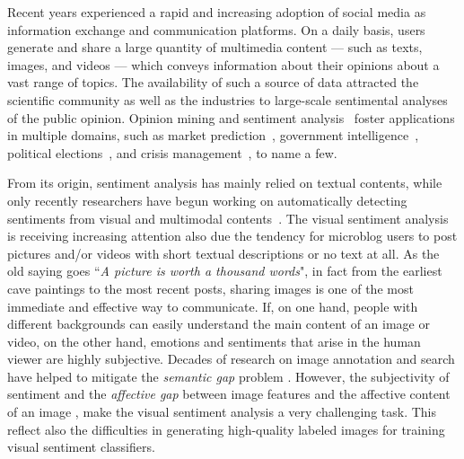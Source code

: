 Recent years experienced a rapid and increasing adoption of social media as information exchange and communication platforms.
On a daily basis, users generate and share a large quantity of multimedia content --- such as texts, images, and videos --- which conveys information about their opinions about a vast range of topics.
The availability of such a source of data attracted the scientific community as well as the industries to large-scale sentimental analyses of the public opinion.
Opinion mining and sentiment analysis~\cite{pang2008opinion} foster applications in multiple domains, such as market prediction~\cite{Mishne2006,Asur2010}, government intelligence~\cite{Abbasi2007}, political elections~\cite{Laver2003,OConnor2010}, and crisis management~\cite{avvenuti2016impromptu,cresci2015linguistically}, to name a few.

From its origin, sentiment analysis has mainly relied on textual contents, while only recently researchers have begun working on automatically detecting sentiments from visual and multimodal contents~\cite{Borth2013:Large-scale,Cao2016,Jou2015:VisualAffect,Siersdorfer2010,You2015:Robust,You2016:Cross-modality}.
The visual sentiment analysis is receiving increasing attention also due the tendency for microblog users to post pictures and/or videos with short textual descriptions or no text at all.
As the old saying goes ``\textit{A picture is worth a thousand words}", in fact from the earliest cave paintings to the most recent posts, sharing images is one of the most immediate and effective way to communicate.
If, on one hand, people with different backgrounds can easily understand the main content of an image or video, on the other hand, emotions and sentiments that arise in the human viewer are highly subjective. Decades of research on image annotation and search have helped to mitigate the \textit{semantic gap} problem \cite{Datta2008,LiUricchio2016}. However, the subjectivity of sentiment and the \textit{affective gap}  between image features and the affective content of an image \cite{Siersdorfer2010},
make the visual sentiment analysis a very challenging task.
This reflect also the difficulties in generating high-quality labeled images for training visual sentiment classifiers.


